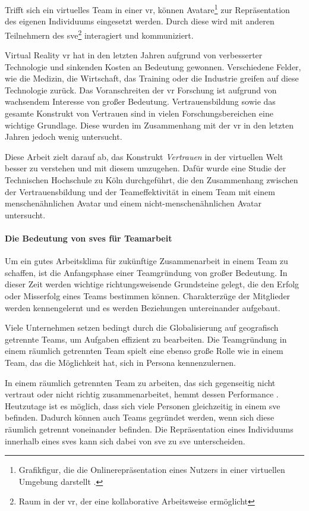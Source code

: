 \documentclass[a4paper,11pt]{article}%
\renewcommand{\\}{\vspace*{0.5\baselineskip} \newline}
\begin{document}
Trifft sich ein virtuelles Team in einer \ac{vr}, können Avatare\footnote{Grafikfigur, die die Onlinerepräsentation eines Nutzers in einer virtuellen Umgebung darstellt \citep[S. 196]{neitzel2010bin}.} zur Repräsentation des eigenen Individuums eingesetzt werden. Durch diese wird mit anderen Teilnehmern des \ac{sve}\footnote{Raum in der \ac{vr}, der eine kollaborative Arbeitsweise ermöglicht} interagiert und kommuniziert.

Virtual Reality \ac{vr} hat in den letzten Jahren aufgrund von verbesserter Technologie und sinkenden Kosten an Bedeutung gewonnen. Verschiedene Felder, wie die Medizin, die Wirtschaft, das Training oder die Industrie greifen auf diese Technologie zurück. Das Voranschreiten der \ac{vr} Forschung ist aufgrund von wachsendem Interesse von großer Bedeutung. Vertrauensbildung sowie das gesamte Konstrukt von Vertrauen sind in vielen Forschungsbereichen eine wichtige Grundlage. Diese wurden im Zusammenhang mit der \ac{vr} in den letzten Jahren jedoch wenig untersucht. 

Diese Arbeit zielt darauf ab, das Konstrukt \textit{Vertrauen} in der virtuellen Welt besser zu verstehen und mit diesem umzugehen. Dafür wurde eine Studie der Technischen Hochschule zu Köln durchgeführt, die den Zusammenhang zwischen der Vertrauensbildung und der Teameffektivität in einem Team mit einem menschenähnlichen Avatar und einem nicht-menschenähnlichen Avatar untersucht.

\paragraph{Die Bedeutung von \ac{sve}s für Teamarbeit}
	Um ein gutes Arbeitsklima für zukünftige Zusammenarbeit in einem Team zu schaffen, ist die Anfangsphase einer Teamgründung von großer Bedeutung. In dieser Zeit werden wichtige richtungsweisende Grundsteine gelegt, die den Erfolg oder Misserfolg eines Teams bestimmen können. Charakterzüge der Mitglieder werden kennengelernt und es werden Beziehungen untereinander aufgebaut.
	
Viele Unternehmen setzen bedingt durch die Globalisierung auf geografisch getrennte Teams, um Aufgaben effizient zu bearbeiten. Die Teamgründung in einem räumlich getrennten Team spielt eine ebenso große Rolle wie in einem Team, das die Möglichkeit hat, sich in Persona kennenzulernen.
	
In einem räumlich getrennten Team zu arbeiten, das sich gegenseitig nicht vertraut oder nicht richtig zusammenarbeitet, hemmt dessen Performance \citep[S. 98-107]{huang1998supporting} \citep[S. 399-417]{turoff1993distributed}.
Heutzutage ist es möglich, dass sich viele Personen gleichzeitig in einem \ac{sve} befinden. Dadurch können auch Teams gegründet werden, wenn sich diese räumlich getrennt voneinander befinden. Die Repräsentation eines Individuums innerhalb eines \ac{sve}s kann sich dabei von \ac{sve} zu \ac{sve} unterscheiden.
	
\end{document}
